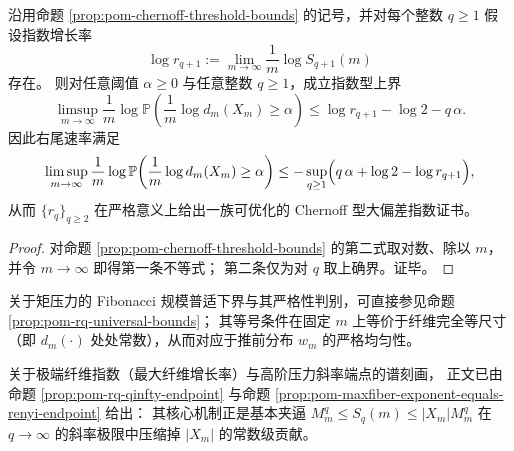 \begin{corollary}\label{cor:pom-wm-tail-ldp-rq-certificate}
沿用命题 \ref{prop:pom-chernoff-threshold-bounds} 的记号，并对每个整数 \(q\ge 1\) 假设指数增长率
\[
\log r_{q+1}:=\lim_{m\to\infty}\frac{1}{m}\log S_{q+1}(m)
\]
存在。
则对任意阈值 \(\alpha\ge 0\) 与任意整数 \(q\ge 1\)，成立指数型上界
\[
\limsup_{m\to\infty}\frac{1}{m}\log \mathbb{P}\!\left(\frac{1}{m}\log d_m(X_m)\ge \alpha\right)
\le
\log r_{q+1}-\log 2-q\,\alpha.
\]
因此右尾速率满足
\[
\limsup_{m\to\infty}\frac{1}{m}\log \mathbb{P}\!\left(\frac{1}{m}\log d_m(X_m)\ge \alpha\right)
\le
-\sup_{q\ge 1}\Bigl(q\,\alpha+\log 2-\log r_{q+1}\Bigr),
\]
从而 \(\{r_q\}_{q\ge 2}\) 在严格意义上给出一族可优化的 Chernoff 型大偏差指数证书。
\end{corollary}
\begin{proof}
对命题 \ref{prop:pom-chernoff-threshold-bounds} 的第二式取对数、除以 \(m\)，并令 \(m\to\infty\) 即得第一条不等式；
第二条仅为对 \(q\) 取上确界。证毕。
\end{proof}

\begin{remark}\label{rem:pom-fib-baseline-and-endpoint}
关于矩压力的 Fibonacci 规模普适下界与其严格性判别，可直接参见命题 \ref{prop:pom-rq-universal-bounds}；
其等号条件在固定 \(m\) 上等价于纤维完全等尺寸（即 \(d_m(\cdot)\) 处处常数），从而对应于推前分布 \(w_m\) 的严格均匀性。
\par
关于极端纤维指数（最大纤维增长率）与高阶压力斜率端点的谱刻画，
正文已由命题 \ref{prop:pom-rq-qinfty-endpoint} 与命题 \ref{prop:pom-maxfiber-exponent-equals-renyi-endpoint} 给出：
其核心机制正是基本夹逼 \(M_m^q\le S_q(m)\le |X_m|M_m^q\) 在 \(q\to\infty\) 的斜率极限中压缩掉 \(|X_m|\) 的常数级贡献。
\end{remark}
